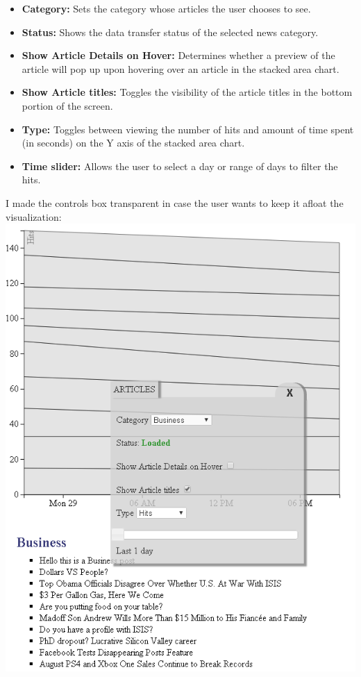 \documentclass[12pt]{article}
\begin{document}
{\begin{itemize}
\item \textbf{Category: } Sets the category whose articles the user chooses to see.
\item \textbf{Status: } Shows the data transfer status of the selected news category.
\item \textbf{Show Article Details on Hover: } Determines whether a preview of the article will pop up upon hovering over an article in the stacked area chart. 
\item \textbf{Show Article titles: } Toggles the visibility of the article titles in the bottom portion of the screen.
\item \textbf{Type: } Toggles between viewing the number of hits and amount of time spent (in seconds) on the Y axis of the stacked area chart.
\item \textbf{Time slider: } Allows the user to select a day or range of days to filter the hits.
\end{itemize}

\newpage

\noindent I made the controls box transparent in case the user wants to keep it afloat the visualization: \\

\noindent\includegraphics[scale=0.8]{img/viz_6}



}
\end{document}
